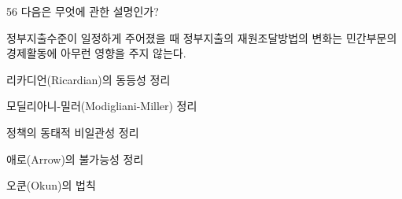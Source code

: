 \begin{question}{56}
다음은 무엇에 관한 설명인가?
\begin{framedtext}
정부지출수준이 일정하게 주어졌을 때 정부지출의 재원조달방법의 변화는 민간부문의 경제활동에 아무런 영향을 주지 않는다.
\end{framedtext}
\begin{choices}
  \item 리카디언(Ricardian)의 동등성 정리
  \item 모딜리아니-밀러(Modigliani-Miller) 정리
  \item 정책의 동태적 비일관성 정리
  \item 애로(Arrow)의 불가능성 정리
  \item 오쿤(Okun)의 법칙
\end{choices}
\end{question}
